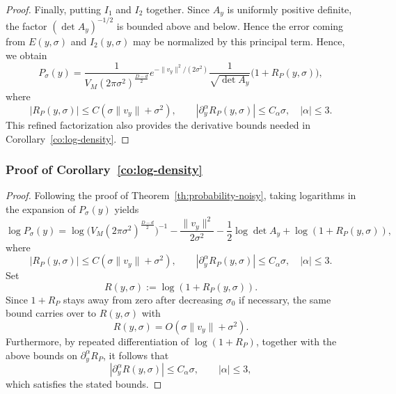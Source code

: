 \documentclass[11pt]{article}
\theoremstyle{plain}
\theoremstyle{definition}
\begin{document}
\begin{proof}
Finally, putting $I_1$ and $I_2$ together. Since $A_y$ is uniformly positive definite, the factor
$(\det A_y)^{-1/2}$ is bounded above and below. Hence the error coming from $E(y,\sigma)$ and $I_2(y,\sigma)$ may be normalized by this principal term. Hence, we obtain
\[
P_\sigma(y)
=
\frac{1}{V_M(2\pi\sigma^2)^{\frac{D-d}{2}}}
e^{-\|v_y\|^2/(2\sigma^2)}
\frac{1}{\sqrt{\det A_y}}
\big(
1 + R_P(y,\sigma)
\big),
\]
where 
\[
|R_P(y,\sigma)|\le C(\sigma\|v_y\|+\sigma^2),
\qquad
|\partial_y^\alpha R_P(y,\sigma)|\le C_\alpha \sigma,\quad |\alpha|\le 3.
\]
This refined factorization also provides the derivative bounds needed in Corollary~\ref{co:log-density}.
\end{proof}

\subsubsection{Proof of Corollary~\ref{co:log-density}}\label{sec:pf-log density}
\begin{proof}
Following the proof of Theorem~\ref{th:probability-noisy}, taking logarithms in the expansion of $P_\sigma(y)$ yields
\[
\log P_\sigma(y)
=
\log \big(V_M(2\pi\sigma^2)^{\frac{D-d}{2}}\big)^{-1}
-\frac{\|v_y\|^2}{2\sigma^2}
-\frac12\log\det A_y
+\log(1+R_P(y,\sigma)),
\]
where 
\[
|R_P(y,\sigma)|\le C(\sigma\|v_y\|+\sigma^2),
\qquad
|\partial_y^\alpha R_P(y,\sigma)|\le C_\alpha \sigma,\quad |\alpha|\le 3.
\]
Set
\[
R(y,\sigma):=\log(1+R_P(y,\sigma)).
\]
Since $1+R_P$ stays away from zero after decreasing $\sigma_0$ if necessary, the same bound carries over to $R(y,\sigma)$ with
\[
R(y,\sigma)=O(\sigma\|v_y\|+\sigma^2).
\]
Furthermore, by repeated differentiation of $\log(1+R_P)$, together with the above bounds on $\partial_y^\alpha R_P$, it follows that
\[
|\partial_y^\alpha R(y,\sigma)| \le C_{\alpha}\sigma,
\qquad |\alpha|\le3,
\]
which satisfies the stated bounds.
\end{proof}
\end{document}
